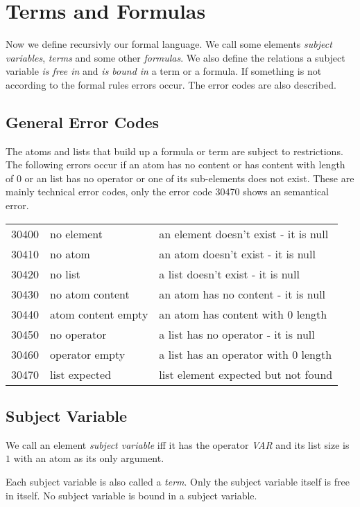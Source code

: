 \documentclass[a4paper,german,10pt,twoside]{book}
\theoremstyle{definition}
\theoremstyle{remark}
\begin{document}
\section{Terms and Formulas} \label{chapter2_section1} \hypertarget{chapter2_section1}{}
Now we define recursivly our formal language. We call some elements \emph{subject variables}, \emph{terms} and some other \emph{formulas}. We also define the relations a subject variable \emph{is free in} and \emph{is bound in} a term or a formula. If something is not according to the formal rules errors occur. The error codes are also described.

\subsection{General Error Codes
}
The atoms and lists that build up a formula or term are subject to restrictions.  The following errors occur if an atom has no content or has content with length of $0$ or an list has no operator or one of its sub-elements does not exist.
These are mainly technical error codes, only the error code 30470 shows an semantical error.

\begin{tabularx}{\linewidth}{llX}
  30400  & no element         & an element doesn't exist - it is null \\
  30410  & no atom            & an atom doesn't exist - it is null \\
  30420  & no list            & a list doesn't exist - it is null \\
  30430  & no atom content    & an atom has no content - it is null \\
  30440  & atom content empty & an atom has content with $0$ length \\
  30450  & no operator        & a list has no operator - it is null \\
  30460  & operator empty     & a list has an operator with $0$ length \\
  30470  & list expected      & list element expected but not found
\end{tabularx}


\subsection{Subject Variable
}
We call an element \emph{subject variable} iff it has the operator \emph{VAR} and its list size is $1$ with an atom as its only argument.

\par
Each subject variable is also called a \emph{term}. Only the subject variable itself is free in itself. No subject variable is bound in a subject variable.
\end{document}
